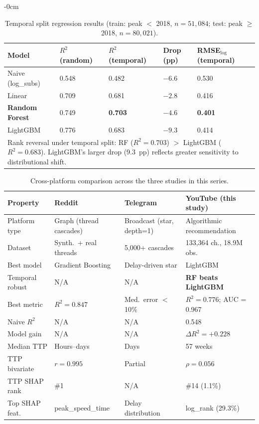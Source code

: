 \documentclass[journal,article,submit,pdftex,moreauthors]{Definitions/mdpi}
\begin{document}
\begin{adjustwidth}{-\extralength}{0cm}
\begin{table}[H]
\caption{Temporal split regression results (train: peak $<$ 2018,
$n = 51{,}084$; test: peak $\geq$ 2018, $n = 80{,}021$).\label{tab:temporal}}
\begin{tabularx}{\textwidth}{lllll}
\toprule
\textbf{Model}&\textbf{$R^2$ (random)}&\textbf{$R^2$ (temporal)}&
\textbf{Drop (pp)}&\textbf{RMSE$_\text{log}$ (temporal)}\\
\midrule
Naive (log\_subs)  & 0.548 & 0.482 & $-6.6$ & 0.530 \\
Linear             & 0.709 & 0.681 & $-2.8$ & 0.416 \\
\textbf{Random Forest} & 0.749 & \textbf{0.703} & $-4.6$ & \textbf{0.401} \\
LightGBM           & 0.776 & 0.683 & $-9.3$ & 0.414 \\
\bottomrule
\multicolumn{5}{l}{\footnotesize Rank reversal under temporal split:
RF ($R^2 = 0.703$) $>$ LightGBM ($R^2 = 0.683$). LightGBM's larger
drop (9.3~pp) reflects greater sensitivity to distributional shift.}
\end{tabularx}
\end{table}

\begin{table}[H]
\caption{Cross-platform comparison across the three studies in this
series.\label{tab:crossplatform}}
\begin{tabularx}{\textwidth}{llll}
\toprule
\textbf{Property}&\textbf{Reddit~\cite{ref-paper1}}&
\textbf{Telegram~\cite{ref-paper2}}&\textbf{YouTube (this study)}\\
\midrule
Platform type  & Graph (thread cascades) & Broadcast (star, depth=1) &
  Algorithmic recommendation \\
Dataset        & Synth.\ + real threads  & 5,000+ cascades &
  133,364 ch., 18.9M obs. \\
Best model     & Gradient Boosting & Delay-driven star & LightGBM \\
Temporal robust & N/A & N/A &
  \textbf{RF beats LightGBM} \\
Best metric    & $R^2 = 0.847$ & Med.\ error $<$ 10\% &
  $R^2 = 0.776$; AUC = 0.967 \\
Naive $R^2$    & N/A & N/A & 0.548 \\
Model gain     & N/A & N/A & $\Delta R^2 = +0.228$ \\
Median TTP     & Hours--days & Days & 57 weeks \\
TTP bivariate  & $r = 0.995$ & Partial & $\rho = 0.056$ \\
TTP SHAP rank  & \#1 & N/A & \#14 (1.1\%) \\
Top SHAP feat. & peak\_speed\_time & Delay distribution &
  log\_rank (29.3\%) \\
\bottomrule
\end{tabularx}
\end{table}

\PublishersNote{}
\end{adjustwidth}
\end{document}
